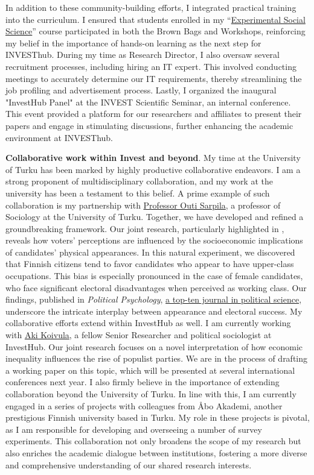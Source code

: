 \documentclass[10pt,stdletter,dateno,sigleft]{newlfm} %
\begin{document}
\begin{newlfm}
In addition to these community-building efforts, I integrated practical training into the curriculum. I ensured that students enrolled in my ``\href{https://github.com/hbahamonde/Exp_Soc_Science/raw/main/Bahamonde_Exp_Soc_Sci.pdf}{Experimental Social Science}'' course participated in both the Brown Bags and Workshops, reinforcing my belief in the importance of hands-on learning as the next step for INVESThub. During my time as Research Director, I also oversaw several recruitment processes, including hiring an IT expert. This involved conducting meetings to accurately determine our IT requirements, thereby streamlining the job profiling and advertisement process. Lastly, I organized the inaugural "InvestHub Panel" at the INVEST Scientific Seminar, an internal conference. This event provided a platform for our researchers and affiliates to present their papers and engage in stimulating discussions, further enhancing the academic environment at INVESThub.

{\bf Collaborative work within Invest and beyond}. My time at the University of Turku has been marked by highly productive collaborative endeavors. I am a strong proponent of multidisciplinary collaboration, and my work at the university has been a testament to this belief. A prime example of such collaboration is my partnership with \href{https://www.utu.fi/en/people/outi-sarpila Outi Sarpila}{Professor Outi Sarpila}, a professor of Sociology at the University of Turku. Together, we have developed and refined a groundbreaking framework. Our joint research, particularly highlighted in \textcite{Bahamonde:2023}, reveals how voters' perceptions are influenced by the socioeconomic implications of candidates' physical appearances. In this natural experiment, we discovered that Finnish citizens tend to favor candidates who appear to have upper-class occupations. This bias is especially pronounced in the case of female candidates, who face significant electoral disadvantages when perceived as working class. Our findings, published in \emph{Political Psychology}, \href{https://www.scimagojr.com/journalrank.php?category=3320}{a top-ten journal in political science}, underscore the intricate interplay between appearance and electoral success. My collaborative efforts extend within InvestHub as well. I am currently working with \href{https://www.utu.fi/en/people/aki-koivula}{Aki Koivula}, a fellow Senior Researcher and political sociologist at InvestHub. Our joint research focuses on a novel interpretation of how economic inequality influences the rise of populist parties. We are in the process of drafting a working paper on this topic, which will be presented at several international conferences next year. I also firmly believe in the importance of extending collaboration beyond the University of Turku. In line with this, I am currently engaged in a series of projects with colleagues from \AA bo Akademi, another prestigious Finnish university based in Turku. My role in these projects is pivotal, as I am responsible for developing and overseeing a number of survey experiments. This collaboration not only broadens the scope of my research but also enriches the academic dialogue between institutions, fostering a more diverse and comprehensive understanding of our shared research interests.


\end{newlfm}
\end{document}
